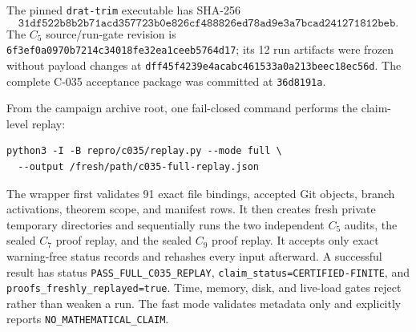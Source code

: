 \documentclass[11pt]{article}
\theoremstyle{definition}
\theoremstyle{remark}
\begin{document}
The pinned \texttt{drat-trim} executable has SHA-256
\[
\texttt{31df522b8b2b71acd357723b0e826cf488826ed78ad9e3a7bcad241271812beb}.
\]
The \(C_5\) source/run-gate revision is
\texttt{6f3ef0a0970b7214c34018fe32ea1ceeb5764d17}; its 12 run artifacts were
frozen without payload changes at
\texttt{dff45f4239e4acabc461533a0a213beec18ec56d}.  The complete C-035
acceptance package was committed at
\texttt{36d8191a}.

From the campaign archive root, one fail-closed command performs the
claim-level replay:
\begin{verbatim}
python3 -I -B repro/c035/replay.py --mode full \
  --output /fresh/path/c035-full-replay.json
\end{verbatim}

The wrapper first validates 91 exact file bindings, accepted Git objects,
branch activations, theorem scope, and manifest rows.  It then creates
fresh private temporary directories and sequentially runs the two
independent \(C_5\) audits, the sealed \(C_7\) proof replay, and the sealed
\(C_9\) proof replay.  It accepts only exact warning-free status records and
rehashes every input afterward.  A successful result has status
\texttt{PASS\_FULL\_C035\_REPLAY},
\texttt{claim\_status=CERTIFIED-FINITE}, and
\texttt{proofs\_freshly\_replayed=true}.  Time, memory, disk, and live-load
gates reject rather than weaken a run.  The fast mode validates metadata
only and explicitly reports
\texttt{NO\_MATHEMATICAL\_\allowbreak CLAIM}.



\end{document}
